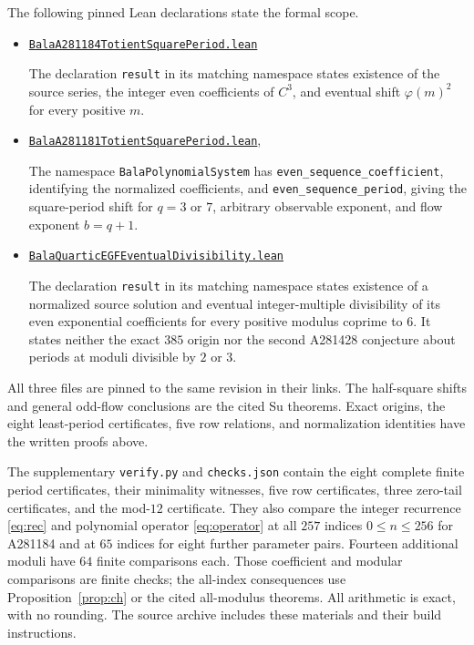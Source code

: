 \documentclass[11pt]{article}
\begin{document}
\begin{samepage}
The following pinned Lean declarations state the formal scope.
\begin{itemize}
\setlength{\itemsep}{0pt}
\setlength{\parsep}{0pt}
\item
\href{https://github.com/the-omega-institute/trureturing/blob/92de86888730265f84e24d28bdb67546c543a966/D5/S1/Recurrence/Periodic/BalaA281184TotientSquarePeriod.lean}{\texttt{BalaA281184TotientSquarePeriod.lean}}
\par\noindent
The declaration \texttt{result} in its matching namespace states existence of the
source series, the integer even coefficients of $C^3$, and eventual
shift $\varphi(m)^2$ for every positive $m$.
\end{itemize}
\end{samepage}
\begin{itemize}
\setlength{\itemsep}{0pt}
\setlength{\parsep}{0pt}
\item
\href{https://github.com/the-omega-institute/trureturing/blob/92de86888730265f84e24d28bdb67546c543a966/D5/S1/Recurrence/Periodic/BalaA281181TotientSquarePeriod.lean}{\texttt{BalaA281181TotientSquarePeriod.lean}},
\par\noindent
The namespace \texttt{BalaPolynomialSystem} has
\texttt{even\_sequence\_coefficient}, identifying the normalized coefficients,
and \texttt{even\_sequence\_period}, giving the square-period shift for
$q=3$ or $7$, arbitrary observable exponent, and flow exponent $b=q+1$.
\item
\href{https://github.com/the-omega-institute/trureturing/blob/92de86888730265f84e24d28bdb67546c543a966/D5/S1/Recurrence/Residue/BalaQuarticEGFEventualDivisibility.lean}{\texttt{BalaQuarticEGFEventualDivisibility.lean}}
\par\noindent
The declaration \texttt{result} in its matching namespace states existence of a
normalized source solution and eventual integer-multiple divisibility
of its even exponential coefficients for every positive modulus coprime
to $6$. It states neither the exact $385$ origin nor the second
A281428 conjecture about periods at moduli divisible by $2$ or $3$.
\end{itemize}
All three files are pinned to the same revision in their links.
The half-square shifts and general odd-flow conclusions are the cited
Su theorems. Exact origins, the eight least-period certificates, five
row relations, and normalization identities have the written proofs above.

The supplementary \texttt{verify.py} and \texttt{checks.json} contain the
eight complete finite period certificates, their minimality witnesses,
five row certificates, three zero-tail certificates, and the mod-$12$
certificate. They also compare the integer recurrence \eqref{eq:rec}
and polynomial operator \eqref{eq:operator} at all $257$ indices
$0\leq n\leq256$ for A281184 and at $65$ indices for eight further
parameter pairs. Fourteen additional moduli have $64$ finite comparisons
each. Those coefficient and modular comparisons are finite checks;
the all-index consequences use Proposition~\ref{prop:ch} or the cited
all-modulus theorems. All arithmetic is exact, with no rounding.
The source archive includes these materials and their build instructions.
\end{document}
